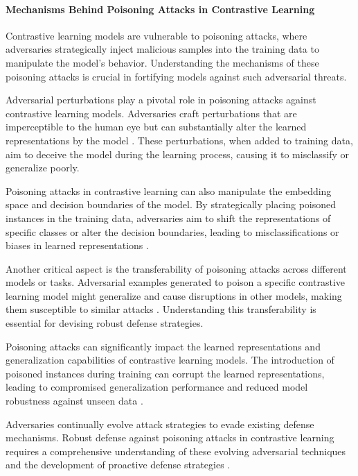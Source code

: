 \paragraph{Mechanisms Behind Poisoning Attacks in Contrastive Learning}

Contrastive learning models are vulnerable to poisoning attacks, where adversaries strategically inject malicious samples into the training data to manipulate the model's behavior. Understanding the mechanisms of these poisoning attacks is crucial in fortifying models against such adversarial threats.

Adversarial perturbations play a pivotal role in poisoning attacks against contrastive learning models. Adversaries craft perturbations that are imperceptible to the human eye but can substantially alter the learned representations by the model \cite{goodfellow2014explaining}. These perturbations, when added to training data, aim to deceive the model during the learning process, causing it to misclassify or generalize poorly.

Poisoning attacks in contrastive learning can also manipulate the embedding space and decision boundaries of the model. By strategically placing poisoned instances in the training data, adversaries aim to shift the representations of specific classes or alter the decision boundaries, leading to misclassifications or biases in learned representations \cite{kim2020adversarial}.

Another critical aspect is the transferability of poisoning attacks across different models or tasks. Adversarial examples generated to poison a specific contrastive learning model might generalize and cause disruptions in other models, making them susceptible to similar attacks \cite{papernot2016transferability}. Understanding this transferability is essential for devising robust defense strategies.

Poisoning attacks can significantly impact the learned representations and generalization capabilities of contrastive learning models. The introduction of poisoned instances during training can corrupt the learned representations, leading to compromised generalization performance and reduced model robustness against unseen data \cite{munoz2017towards}.

Adversaries continually evolve attack strategies to evade existing defense mechanisms. Robust defense against poisoning attacks in contrastive learning requires a comprehensive understanding of these evolving adversarial techniques and the development of proactive defense strategies \cite{biggio2013evasion}.


